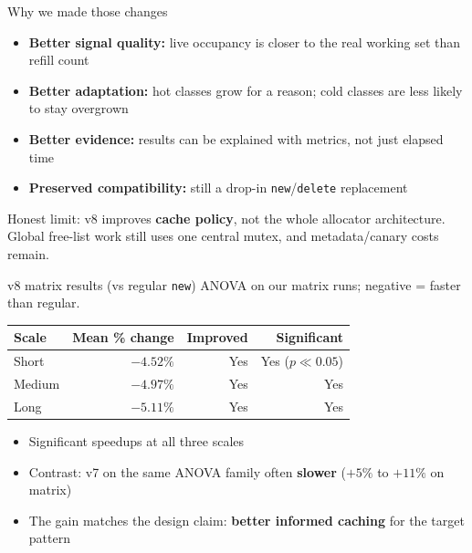 \begin{frame}{Why we made those changes}
    \begin{itemize}
        \item \textbf{Better signal quality:} live occupancy is closer to the
              real working set than refill count
        \item \textbf{Better adaptation:} hot classes grow for a reason; cold
              classes are less likely to stay overgrown
        \item \textbf{Better evidence:} results can be explained with metrics,
              not just elapsed time
        \item \textbf{Preserved compatibility:} still a drop-in
              \texttt{new}/\texttt{delete} replacement
    \end{itemize}

    \vspace{0.4em}
    {\footnotesize
    Honest limit: v8 improves \textbf{cache policy}, not the whole allocator
    architecture. Global free-list work still uses one central mutex, and
    metadata/canary costs remain.}
\end{frame}

\begin{frame}{v8 matrix results (vs regular \texttt{new})}
    ANOVA on our matrix runs; negative = faster than regular.

    \vspace{0.6em}
    \begin{center}
    {\small
    \begin{tabular}{@{}lrrr@{}}
        \toprule
        Scale & Mean \% change & Improved & Significant \\
        \midrule
        Short  & \(\mathbf{-4.52\%}\) & Yes & Yes (\(p{\ll}0.05\)) \\
        Medium & \(\mathbf{-4.97\%}\) & Yes & Yes \\
        Long   & \(\mathbf{-5.11\%}\) & Yes & Yes \\
        \bottomrule
    \end{tabular}
    }
    \end{center}

    \vspace{0.7em}
    \begin{itemize}
        \item Significant speedups at all three scales
        \item Contrast: v7 on the same ANOVA family often \textbf{slower}
              (\(+5\%\) to \(+11\%\) on matrix)
        \item The gain matches the design claim: \textbf{better informed caching}
              for the target pattern
    \end{itemize}
\end{frame}
